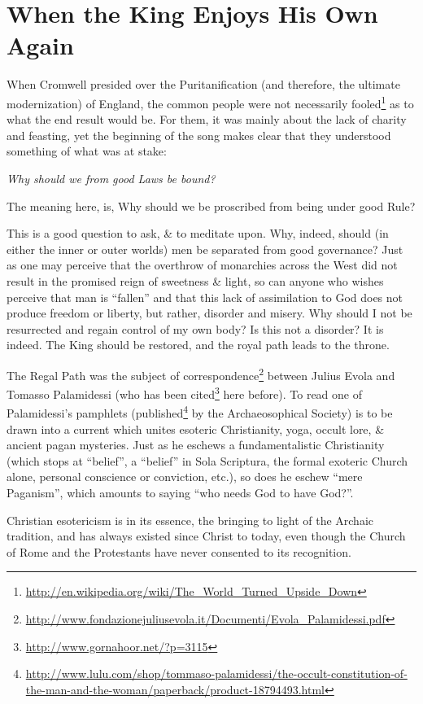 \section{When the King Enjoys His Own Again}

When Cromwell presided over the Puritanification (and therefore, the ultimate modernization) of England, the common people were not necessarily fooled\footnote{\url{http://en.wikipedia.org/wiki/The_World_Turned_Upside_Down}} as to what the end result would be. For them, it was mainly about the lack of charity and feasting, yet the beginning of the song makes clear that they understood something of what was at stake:

\emph{Why should we from good Laws be bound?}

The meaning here, is, Why should we be proscribed from being under good Rule?

This is a good question to ask, \& to meditate upon. Why, indeed, should (in either the inner or outer worlds) men be separated from good governance? Just as one may perceive that the overthrow of monarchies across the West did not result in the promised reign of sweetness \& light, so can anyone who wishes perceive that man is ``fallen'' and that this lack of assimilation to God does not produce freedom or liberty, but rather, disorder and misery. Why should I not be resurrected and regain control of my own body? Is this not a disorder? It is indeed. The King should be restored, and the royal path leads to the throne.

The Regal Path was the subject of correspondence\footnote{\url{http://www.fondazionejuliusevola.it/Documenti/Evola_Palamidessi.pdf}} between Julius Evola and Tomasso Palamidessi (who has been cited\footnote{\url{http://www.gornahoor.net/?p=3115}} here before). To read one of Palamidessi's pamphlets (published\footnote{\url{http://www.lulu.com/shop/tommaso-palamidessi/the-occult-constitution-of-the-man-and-the-woman/paperback/product-18794493.html}} by the Archaeosophical Society) is to be drawn into a current which unites esoteric Christianity, yoga, occult lore, \& ancient pagan mysteries. Just as he eschews a fundamentalistic Christianity (which stops at ``belief'', a ``belief'' in Sola Scriptura, the formal exoteric Church alone, personal conscience or conviction, etc.), so does he eschew ``mere Paganism'', which amounts to saying ``who needs God to have God?''.

\begin{quotex}
Christian esotericism is in its essence, the bringing to light of the Archaic tradition, and has always existed since Christ to today, even though the Church of Rome and the Protestants have never consented to its recognition.
\end{quotex}


